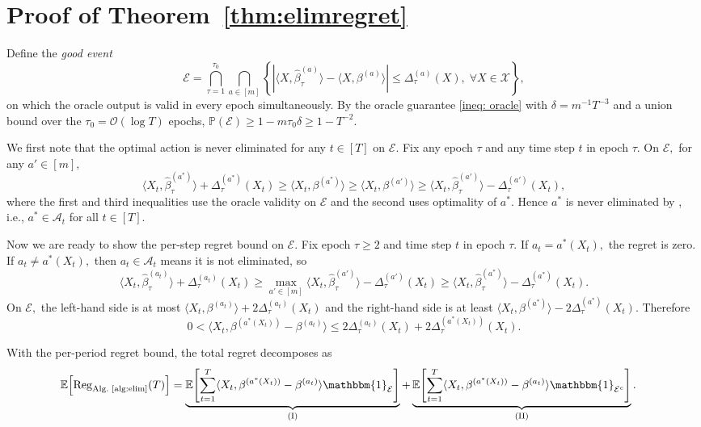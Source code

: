 \documentclass[mnsc]{informs3aa} %
\newcommand{\Reg}{\mathrm{Reg}}
\newcommand{\abs}[1]{\left|#1\right|}
\renewcommand{\hat}{\widehat}
\newcommand{\mA}{\mathcal A}
\renewcommand{\hat}{\widehat}
\newcommand{\indi}{\mathbbm{1}}
\renewcommand{\hat}{\widehat}
\newcommand{\mO}{\mathcal O}
\newcommand{\mX}{\mathcal X}
\newcommand{\mE}{\mathcal E}
\begin{document}
\section{Proof of Theorem~\ref{thm:elimregret}}\label{sec: proof_elimregret}

Define the \emph{good event}
\[\mE=\bigcap_{\tau=1}^{\tau_0}\bigcap_{a\in[m]}\left\{\abs{\langle X,\hat\beta_\tau^{(a)}\rangle-\langle X,\beta^{(a)}\rangle}\leq \Delta_\tau^{(a)}(X),\;\forall X\in\mX\right\},\]
on which the oracle output is valid in every epoch simultaneously. By the oracle guarantee \eqref{ineq: oracle} with $\delta=m^{-1}T^{-3}$ and a union bound over the $\tau_0=\mO(\log T)$ epochs, $\mathbb{P}(\mE)\geq 1-m\tau_0\delta\geq 1-T^{-2}.$

We first note that the optimal action is never eliminated for any $t\in[T]$ on $\mE$. Fix any epoch $\tau$ and any time step $t$ in epoch $\tau.$ On $\mE,$ for any $a'\in[m],$
\[\langle X_t,\hat\beta_\tau^{(a^*)}\rangle+\Delta_\tau^{(a^*)}(X_t)\geq \langle X_t,\beta^{(a^*)}\rangle\geq \langle X_t,\beta^{(a')}\rangle\geq \langle X_t,\hat\beta_\tau^{(a')}\rangle-\Delta_\tau^{(a')}(X_t),\]
where the first and third inequalities use the oracle validity on $\mE$ and the second uses optimality of $a^*.$ Hence $a^*$ is never eliminated by , i.e., $a^*\in\mA_t$ for all $t\in[T].$

Now we are ready to show the per-step regret bound on $\mE$. Fix epoch $\tau\geq 2$ and time step $t$ in epoch $\tau.$ If $a_t=a^*(X_t),$ the regret is zero. If $a_t\neq a^*(X_t),$ then $a_t\in\mA_t$ means it is not eliminated, so
\[\langle X_t,\hat\beta_\tau^{(a_t)}\rangle+\Delta_\tau^{(a_t)}(X_t)\geq \max_{a'\in[m]}\langle X_t,\hat\beta_\tau^{(a')}\rangle-\Delta_\tau^{(a')}(X_t)\geq \langle X_t,\hat\beta_\tau^{(a^*)}\rangle-\Delta_\tau^{(a^*)}(X_t).\]
On $\mE,$ the left-hand side is at most $\langle X_t,\beta^{(a_t)}\rangle+2\Delta_\tau^{(a_t)}(X_t)$ and the right-hand side is at least $\langle X_t,\beta^{(a^*)}\rangle-2\Delta_\tau^{(a^*)}(X_t).$ Therefore
\begin{equation}\label{eq: perstep_regret}
0<\langle X_t,\beta^{(a^*(X_t))}-\beta^{(a_t)}\rangle\leq 2\Delta_\tau^{(a_t)}(X_t)+2\Delta_\tau^{(a^*(X_t))}(X_t).
\end{equation}

With the per-period regret bound, the total regret decomposes as
\begin{align}
\mathbb{E}\!\left[\Reg_{\text{Alg.~\ref{alg:elim}}}(T)\right]
&= \underbrace{\mathbb{E}\!\left[\sum_{t=1}^T\langle X_t,\beta^{(a^*(X_t))}-\beta^{(a_t)}\rangle\indi_\mE\right]}_{\text{(I)}}+\underbrace{\mathbb{E}\!\left[\sum_{t=1}^T\langle X_t,\beta^{(a^*(X_t))}-\beta^{(a_t)}\rangle\indi_{\mE^c}\right]}_{\text{(II)}}.\label{eq: regret_decomp}
\end{align}
\end{document}
